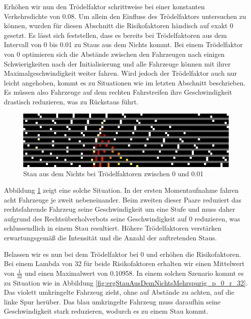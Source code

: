 \documentclass[10pt, a4paper]{article}
\begin{document}
Erhöhen wir nun den Trödelfaktor schrittweise bei einer konstanten Verkehrsdichte von 0.08. Um allein den Einfluss des Trödelfaktors untersuchen zu können, wurden für diesen Abschnitt die Risikofaktoren händisch auf exakt 0 gesetzt. Es lässt sich feststellen, dass es bereits bei Trödelfaktoren aus dem Intervall von 0 bis 0.01 zu Staus aus dem Nichts kommt. Bei einem Trödelfaktor von 0 optimieren sich die Abstände zwischen den Fahrzeugen nach einigen Schwierigkeiten nach der Initialisierung und alle Fahrzeuge können mit ihrer Maximalgeschwindigkeit weiter fahren. Wird jedoch der Trödelfaktor auch nur leicht angehoben, kommt es zu Situationen wie im letzten Abschnitt beschrieben. Es müssen also Fahrzeuge auf dem rechten Fahrstreifen ihre Geschwindigkeit drastisch reduzieren, was zu Rückstaus führt.

\begin{figure}[h!]
	\centering
	\includegraphics[width=\textwidth]{img/erg_mehrspurig_stau_aus_dem_nichts_p_0_01}
	\caption{Stau aus dem Nichts bei Trödelfaktoren zwischen 0 und 0.01}
	\label{fig:ergStauAusDemNichtsMehrspurigP0_01}
\end{figure}

Abbildung \ref{fig:ergStauAusDemNichtsMehrspurigP0_01} zeigt eine solche Situation. In der ersten Momentaufnahme fahren acht Fahrzeuge je zweit nebeneinander. Beim zweiten dieser Paare reduziert das rechtsfahrende Fahrzeug seine Geschwindigkeit um eine Stufe und muss daher aufgrund des Rechtsüberholverbots seine Geschwindigkeit auf 0 reduzieren, was schlussendlich in einem Stau resultiert. Höhere Trödelfaktoren verstärken erwartungsgemäß die Intensität und die Anzahl der auftretenden Staus.

Belassen wir es nun bei dem Trödelfaktor bei 0 und erhöhen die Risikofaktoren. Bei einem Lambda von 32 für beide Risikofaktoren erhalten wir einen Mittelwert von $\frac{1}{32}$ und einen Maximalwert von 0.10958. In einem solchen Szenario kommt es zu Situation wie in Abbildung \ref{fig:ergStauAusDemNichtsMehrspurig_p_0_r_32}. Das violett umkringelte Fahrzeug zieht, ohne auf Abstände zu achten, auf die linke Spur herüber. Das blau umkringelte Fahrzeug muss daraufhin seine Geschwindigkeit stark reduzieren, wodurch es zu einem Stau kommt.
\end{document}
